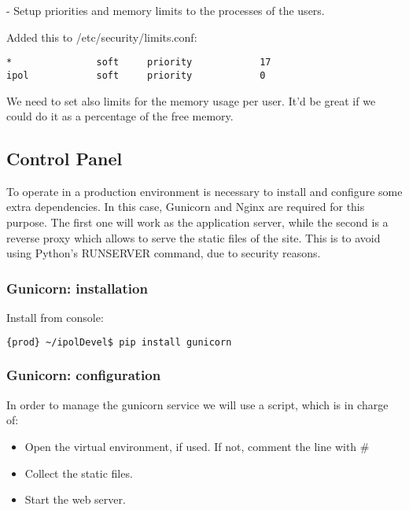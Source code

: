 - Setup priorities and memory limits to the processes of the users.

Added this to /etc/security/limits.conf:
\begin{verbatim}
*               soft     priority            17
ipol            soft     priority            0
\end{verbatim}

We need to set also limits for the memory usage per user. It'd be great if we could do it as a percentage of the free memory.


%
%
%

\subsection{Control Panel}
To operate in a production environment is necessary to install and configure some extra dependencies. In this case, Gunicorn and Nginx are required for this purpose. The first one will work as the application server, while the second is a reverse proxy which allows to serve the static files of the site. This is to avoid using Python's RUNSERVER command, due to security reasons.

\subsubsection{Gunicorn: installation}

Install from console:
\begin{lstlisting}[language=Bash]
{prod} ~/ipolDevel$ pip install gunicorn
\end{lstlisting}

\subsubsection{Gunicorn: configuration}
In order to manage the gunicorn service we will use a script, which is in charge of:
\begin{itemize}
\item Open the virtual environment, if used. If not, comment the line with \#
\item Collect the static files.
\item Start the web server.
\end{itemize}

